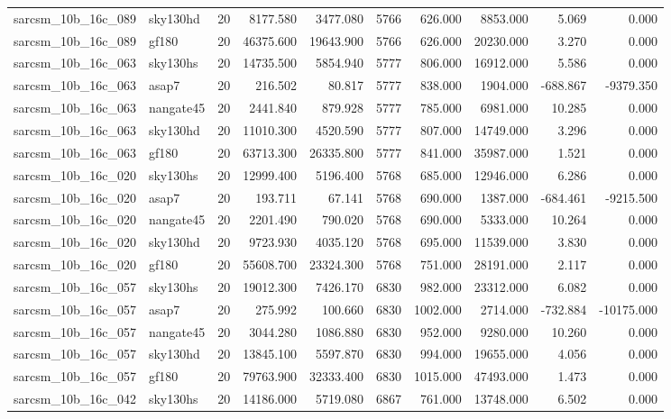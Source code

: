 \begin{longtable}{llrrrrrrrr}
sarcsm\_10b\_16c\_089 & sky130hd & 20 & 8177.580 & 3477.080 & 5766 & 626.000 & 8853.000 & 5.069 & 0.000 \\
sarcsm\_10b\_16c\_089 & gf180 & 20 & 46375.600 & 19643.900 & 5766 & 626.000 & 20230.000 & 3.270 & 0.000 \\
sarcsm\_10b\_16c\_063 & sky130hs & 20 & 14735.500 & 5854.940 & 5777 & 806.000 & 16912.000 & 5.586 & 0.000 \\
sarcsm\_10b\_16c\_063 & asap7 & 20 & 216.502 & 80.817 & 5777 & 838.000 & 1904.000 & -688.867 & -9379.350 \\
sarcsm\_10b\_16c\_063 & nangate45 & 20 & 2441.840 & 879.928 & 5777 & 785.000 & 6981.000 & 10.285 & 0.000 \\
sarcsm\_10b\_16c\_063 & sky130hd & 20 & 11010.300 & 4520.590 & 5777 & 807.000 & 14749.000 & 3.296 & 0.000 \\
sarcsm\_10b\_16c\_063 & gf180 & 20 & 63713.300 & 26335.800 & 5777 & 841.000 & 35987.000 & 1.521 & 0.000 \\
sarcsm\_10b\_16c\_020 & sky130hs & 20 & 12999.400 & 5196.400 & 5768 & 685.000 & 12946.000 & 6.286 & 0.000 \\
sarcsm\_10b\_16c\_020 & asap7 & 20 & 193.711 & 67.141 & 5768 & 690.000 & 1387.000 & -684.461 & -9215.500 \\
sarcsm\_10b\_16c\_020 & nangate45 & 20 & 2201.490 & 790.020 & 5768 & 690.000 & 5333.000 & 10.264 & 0.000 \\
sarcsm\_10b\_16c\_020 & sky130hd & 20 & 9723.930 & 4035.120 & 5768 & 695.000 & 11539.000 & 3.830 & 0.000 \\
sarcsm\_10b\_16c\_020 & gf180 & 20 & 55608.700 & 23324.300 & 5768 & 751.000 & 28191.000 & 2.117 & 0.000 \\
sarcsm\_10b\_16c\_057 & sky130hs & 20 & 19012.300 & 7426.170 & 6830 & 982.000 & 23312.000 & 6.082 & 0.000 \\
sarcsm\_10b\_16c\_057 & asap7 & 20 & 275.992 & 100.660 & 6830 & 1002.000 & 2714.000 & -732.884 & -10175.000 \\
sarcsm\_10b\_16c\_057 & nangate45 & 20 & 3044.280 & 1086.880 & 6830 & 952.000 & 9280.000 & 10.260 & 0.000 \\
sarcsm\_10b\_16c\_057 & sky130hd & 20 & 13845.100 & 5597.870 & 6830 & 994.000 & 19655.000 & 4.056 & 0.000 \\
sarcsm\_10b\_16c\_057 & gf180 & 20 & 79763.900 & 32333.400 & 6830 & 1015.000 & 47493.000 & 1.473 & 0.000 \\
sarcsm\_10b\_16c\_042 & sky130hs & 20 & 14186.000 & 5719.080 & 6867 & 761.000 & 13748.000 & 6.502 & 0.000 \\

\end{longtable}
